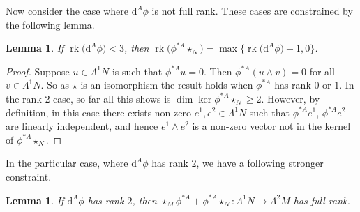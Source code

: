 \documentclass[10pt,a4paper]{amsart}
\newcommand{\1}{{\mathbb{1}}}
\def \d{\mathrm{d}}
\newcommand{\rk}{{\operatorname{rk}}}
\numberwithin{equation}{section}
\newtheorem{Lemma}[Theorem]{Lemma}
\begin{document}
Now consider the case where $\d^A\phi$ is not full rank. These cases are constrained by the following lemma.
\begin{Lemma}\label{lem:nullity}
 If $\rk\big(\d^A\phi\big)<3$, then $\rk\big(\phi^{\ast A}\star_N\big)=\max\bigl\{\rk\big(\d^A\phi\big)-1,0\bigr\}$.
\end{Lemma}
\begin{proof}
 Suppose $u\in\Lambda^1N$ is such that $\phi^{\ast A}u=0$. Then $\phi^{\ast A}(u\wedge v)=0$ for all $v\in\Lambda^1N$. So as $\star$ is an isomorphism the result holds when $\phi^{\ast A}$ has rank $0$ or $1$. In the rank $2$ case, so far all this shows is $\dim\ker\phi^{\ast A}\star_{N}\geq2$. However, by definition, in this case there exists non-zero $e^1, e^2\in\Lambda^1N$ such that $\phi^{\ast A}e^1$, $\phi^{\ast A}e^2$ are linearly independent, and hence $e^1\wedge e^2$ is a non-zero vector not in the kernel of $\phi^{\ast A}\star_{N}$.
\end{proof}
In the particular case, where $\d^A\phi$ has rank $2$, we have a following stronger constraint.
\begin{Lemma}\label{lem:rank-2-reduction}
 If $\d^A\phi$ has rank $2$, then $\star_{M}\phi^{\ast A}+\phi^{\ast A}\star_{N}\colon \Lambda^1N\to\Lambda^2M$ has full rank.
\end{Lemma}
\end{document}
